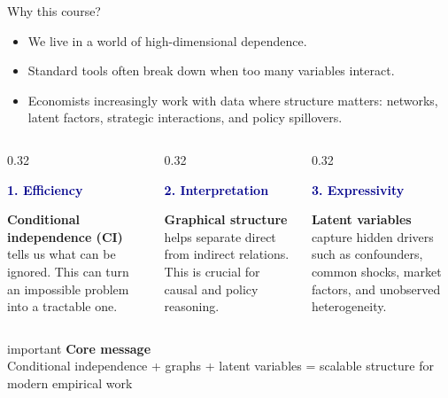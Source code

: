 \documentclass[dvipsnames,aspectratio=169,handout]{beamer}
\begin{document}
\begin{frame}{Why this course?}
\begin{itemize}
    \item We live in a world of \alert{high-dimensional dependence}.
    \item Standard tools often break down when too many variables interact.
    \item Economists increasingly work with data where \alert{structure} matters:
    networks, latent factors, strategic interactions, and policy spillovers.
\end{itemize}
\vspace{-6mm}
\begin{columns}[T]
\begin{column}{0.32\textwidth}
    \begin{center}
        \textcolor{DarkBlue}{\textbf{1. Efficiency}}
    \end{center}
    \small
    \textbf{Conditional independence (CI) } tells us what can be ignored.
    This can turn an impossible problem into a tractable one.
\end{column}
\quad
\begin{column}{0.32\textwidth}
    \begin{center}
        \textcolor{DarkBlue}{\textbf{2. Interpretation}}
    \end{center}
    \small
    \textbf{Graphical structure} helps separate direct from indirect relations.
    This is crucial for causal and policy reasoning.
\end{column}
\begin{column}{0.32\textwidth}
    \begin{center}
        \textcolor{DarkBlue}{\textbf{3. Expressivity}}
    \end{center}
    \small
    \textbf{Latent variables} capture hidden drivers such as confounders,
    common shocks, market factors, and unobserved heterogeneity.
\end{column}
\end{columns}
\medskip
\begin{beamercolorbox}[wd=\textwidth,sep=3pt,center,rounded=true,shadow=true]{important}
{\Large \textbf{Core message}}\\[1mm]
\alert{Conditional independence + graphs + latent variables = scalable structure for modern empirical work}
\end{beamercolorbox}
\end{frame}
\end{document}
